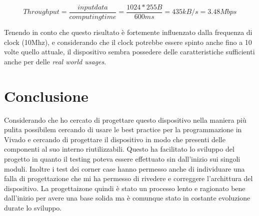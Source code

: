 \documentclass[a4paper]{report}
\begin{document}
\[
	Throughput = \frac{input data}{computing time} = \frac{1024 * 255B}{600ms} = 435kB/s = 3.48Mbps
\]

  Tenendo in conto che questo risultato è fortemente influenzato dalla frequenza di clock (10Mhz), e considerando che il clock potrebbe essere spinto anche fino a 10 volte quello attuale, il dispositivo sembra possedere delle caratteristiche sufficienti anche per delle \textit{real world usages}.


\chapter{Conclusione}
Considerando che ho cercato di progettare questo dispositivo nella maniera più pulita possibilem cercando di usare le best practice per la programmazione in Vivado e cercando di progettare il dispositivo in modo che presenti delle componenti al suo interno riutilizzabili.
Questo ha facilitato lo sviluppo del progetto in quanto il testing poteva essere effettuato sin dall'inizio sui singoli moduli.
Inoltre i test dei corner case hanno permesso anche di individuare una falla di progettazione che mi ha permesso di rivedere e correggere l'archittura del dispositivo.
La progettaizone quindi è stato un processo lento e ragionato bene dall'inizio per avere una base solida ma è comunque stato in costante evoluzione durate lo sviluppo.
\end{document}
